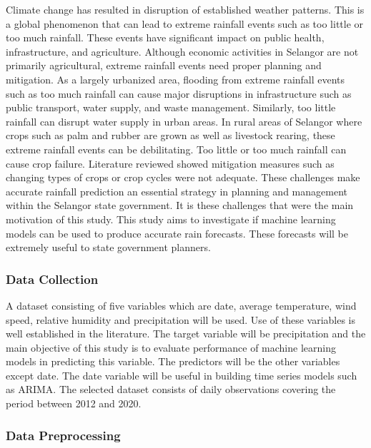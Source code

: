 \documentclass{article}
\begin{document}
Climate change has resulted in disruption of established weather patterns. This is a global
phenomenon that can lead to extreme rainfall events such as too little or too much rainfall.
These events have significant impact on public health, infrastructure, and agriculture. Although
economic activities in Selangor are not primarily agricultural, extreme rainfall events need
proper planning and mitigation. As a largely urbanized area, flooding from extreme rainfall
events such as too much rainfall can cause major disruptions in infrastructure such as public
transport, water supply, and waste management. Similarly, too little rainfall can disrupt water
supply in urban areas. In rural areas of Selangor where crops such as palm and rubber are grown
as well as livestock rearing, these extreme rainfall events can be debilitating. Too little or too
much rainfall can cause crop failure. Literature reviewed showed mitigation measures such as
changing types of crops or crop cycles were not adequate. These challenges make accurate
rainfall prediction an essential strategy in planning and management within the Selangor state
government. It is these challenges that were the main motivation of this study. This study aims
to investigate if machine learning models can be used to produce accurate rain forecasts. These
forecasts will be extremely useful to state government planners.

\subsubsection{Data Collection}

A dataset consisting of five variables which are date, average temperature, wind speed, relative
humidity and precipitation will be used. Use of these variables is well established in the
literature. The target variable will be precipitation and the main objective of this study is to
evaluate performance of machine learning models in predicting this variable. The predictors
will be the other variables except date. The date variable will be useful in building time series
models such as ARIMA. The selected dataset consists of daily observations covering the period
between 2012 and 2020.

\subsubsection{Data Preprocessing}
\end{document}
